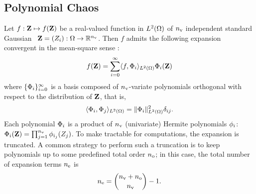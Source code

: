\subsection{Polynomial Chaos} 
Let $f: \mathbf{Z} \mapsto f(\mathbf{Z})$ be a real-valued function in ${L^{2}(\Omega)}$ of ${n_\text{v}}$ independent standard Gaussian \rvs\ $\mathbf{Z} = (Z_i): \Omega \to \mathbb{R}^{n_\text{v}}$. Then $f$ admits the following expansion convergent in the mean-square sense \cite{maitre2010}:
\begin{equation} \elabel{pc-expansion}
  f(\vZ) = \sum_{i = 0}^\infty \iprod{f, \vpcb_i}_\H \vpcb_i(\vZ)
\end{equation}
where $\{ \Phi_i \}_{i = 0}^\infty$ is a basis composed of ${n_\text{v}}$-variate polynomials orthogonal with respect to the distribution of $\mathbf{Z}$, that is,
\[
  \langle \Phi_i, \Phi_j \rangle_{L^{2}(\Omega)} = \| \Phi_i \|^2_{L^{2}(\Omega)} \delta_{ij}.
\]
Each polynomial $\Phi_i$ is a product of ${n_\text{v}}$ (univariate) Hermite polynomials $\phi_i$: $\Phi_i(\mathbf{Z}) = \prod_{j = 1}^{n_\text{v}} \phi_{i_j}(Z_j)$. To make  tractable for computations, the expansion is truncated. A common strategy to perform such a truncation is to keep polynomials up to some predefined total order ${n_\text{o}}$; in this case, the total number of expansion terms ${n_\text{e}}$ is
\[
  {n_\text{e}} = {{n_\text{v}} + {n_\text{o}} \choose {n_\text{v}}} - 1.
\]
